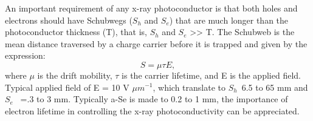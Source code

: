 An important requirement of any x-ray photoconductor is that both holes and electrons should have Schubwegs ($S_h$ and $S_e$) that are much longer than the photoconductor thickness (T), that is, $S_h$ and $S_e$ >> T.  The Schubweb is the mean distance traversed by a charge carrier before it is trapped and given by the expression:
\begin{equation}
S = \mu \tau E,
\end{equation}
where $\mu$ is the drift mobility, $\tau$ is the carrier lifetime, and E is the applied field.  Typical applied field of E = 10 V $\mu m^{-1}$, which translate to $S_h$~6.5 to 65 mm and $S_e$ ~=.3 to 3 mm.  Typically a-Se is made to 0.2 to 1 mm, the importance of electron lifetime in controlling the x-ray photoconductivity can be appreciated.


